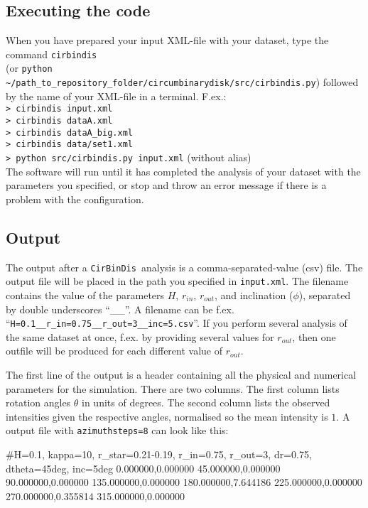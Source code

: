 \documentclass[a4paper, 12pt, english, titlepage]{article}
\newcommand{\sname}{\texttt{CirBinDis }}
\begin{document}
\subsection{Executing the code}
    When you have prepared your input XML-file with your dataset, type the command \texttt{cirbindis} \\
    (or \texttt{python \textasciitilde/path\_to\_repository\_folder/circumbinarydisk/src/cirbindis.py})
    followed by the name of your XML-file in a terminal.
    F.ex.: \\
    \texttt{> cirbindis input.xml} \\
    \texttt{> cirbindis dataA.xml} \\
    \texttt{> cirbindis dataA\_big.xml} \\
    \texttt{> cirbindis data/set1.xml} \\
    \texttt{> python src/cirbindis.py input.xml} (without alias) \\
    The software will run until it has completed the analysis of your dataset with the parameters you specified, or stop and throw an error message if there is a problem with the configuration.

\subsection{Output}
    The output after a \sname analysis is a comma-separated-value (csv) file. The output file will be placed in the path you specified in \texttt{input.xml}. The filename contains the value of the parameters $H$, $r_{in}$, $r_{out}$, and inclination ($\phi$), separated by double underscores ``\_\_''. A filename can be f.ex.
    ``\texttt{H=0.1\_\_r\_in=0.75\_\_r\_out=3\_\_inc=5.csv}''.
    If you perform several analysis of the same dataset at once, f.ex. by providing several values for $r_{out}$, then one outfile will be produced for each different value of $r_{out}$.

    The first line of the output is a header containing all the physical and numerical parameters for the simulation. There are two columns. The first column lists rotation angles $\theta$ in units of degrees. The second column lists the observed intensities given the respective angles, normalised so the mean intensity is $1$. A output file with \texttt{azimuthsteps=8} can look like this:
\begin{verbatim*}
#H=0.1, kappa=10, r_star=0.21-0.19, r_in=0.75, r_out=3, dr=0.75,
dtheta=45deg, inc=5deg
0.000000,0.000000
45.000000,0.000000
90.000000,0.000000
135.000000,0.000000
180.000000,7.644186
225.000000,0.000000
270.000000,0.355814
315.000000,0.000000
\end{verbatim*}
\end{document}
